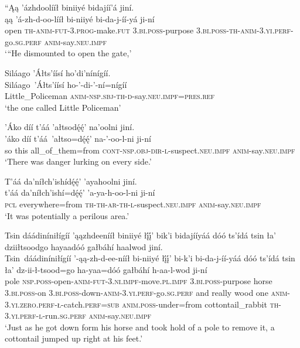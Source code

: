 \ea\label{ex:text2-16-1}
``Ąą ’ázhdoolííł biniiyé bidajíí’á jiní.\\
\gll ąą	’á-zh-d-oo-lííł	bi-niiyé	bi-da-j-íí-yá	ji-ní\\
     open	\textsc{th}-\textsc{anim}-\textsc{fut}-3.\textsc{prog}-make.\textsc{fut}	3.\textsc{bi}.\textsc{poss}-purpose	3.\textsc{bi}.\textsc{poss}-\textsc{th}-\textsc{anim}-3.\textsc{yi}.\textsc{perf}-go.\textsc{sg}.\textsc{perf}	\textsc{anim}-say.\textsc{neu}.\textsc{impf}\\
\glt `{``}He dismounted to open the gate,'
\z

\ea\label{ex:text2-16-2}
Siláago ’Áłts’íísí ho’di’nínígíí.\\
\gll Siláago~{’Áłts’íísí}	ho-’-di-’-ní=nígíí\\
     Little\_Policeman	\textsc{anim}-\textsc{nsp}.\textsc{sbj}-\textsc{th}-\textsc{d}-say.\textsc{neu}.\textsc{impf}=\textsc{pres}.\textsc{ref}\\
\glt `the one called Little Policeman'
\z

\ea\label{ex:text2-16-3}
’Áko díí t’áá ’ałtsodę́ę́’ na’oolni jiní.\\
\gll ’áko	díí	t’áá~{’ałtso=dę́ę́’}	na-’-oo-l-ni	ji-ní\\
     so	this	all\_of\_them=from	\textsc{cont}-\textsc{nsp}.\textsc{obj}-\textsc{dir}-\textsc{l}-suspect.\textsc{neu}.\textsc{impf}	\textsc{anim}-say.\textsc{neu}.\textsc{impf}\\
\glt `There was danger lurking on every side.'
\z

\ea\label{ex:text2-16-4}
T’áá da’níłch’ishídę́ę́’ ’ayahoolni jiní.\\
\gll t’áá	da’níłch’ishí=dę́ę́’	’a-ya-h-oo-l-ni	ji-ní\\
     \textsc{pcl}	everywhere=from	\textsc{th}-\textsc{th}-\textsc{ar}-\textsc{th}-\textsc{l}-suspect.\textsc{neu}.\textsc{impf}	\textsc{anim}-say.\textsc{neu}.\textsc{impf}\\
\glt `It was potentially a perilous area.'
\z

\ea\label{ex:text2-16-5}
Tsin dáádiníniłígíí ’ąązhdeenííł biniiyé łį́į́’ bik’i bidajííyáá dóó ts’ídá tsin ła’ dziiłtsoodgo hayaadóó gałbáhí haalwod jiní.\\
\gll Tsin~{dáádiníniłígíí}	’-ąą-zh-d-ee-nííł	bi-niiyé	łį́į́’	bi-k’i	bi-da-j-íí-yáá	dóó	ts’ídá	tsin	ła’	dz-ii-ł-tsood=go	ha-yaa=dóó	gałbáhí	h-aa-l-wod	ji-ní\\
     pole	\textsc{nsp}.\textsc{poss}-open-\textsc{anim}-\textsc{fut}-3.\textsc{ni}.\textsc{impf}-move.\textsc{pl}.\textsc{impf}	3.\textsc{bi}.\textsc{poss}-purpose	horse	3.\textsc{bi}.\textsc{poss}-on	3.\textsc{bi}.\textsc{poss}-down-\textsc{anim}-3.\textsc{yi}.\textsc{perf}-go.\textsc{sg}.\textsc{perf}	and	really	wood	one	\textsc{anim}-3.\textsc{yi}.\textsc{zero}.\textsc{perf}-\textsc{ł}-catch.\textsc{perf}=\textsc{sub}	\textsc{anim}.\textsc{poss}-under=from	cottontail\_rabbit	\textsc{th}-3.\textsc{yi}.\textsc{perf}-\textsc{l}-run.\textsc{sg}.\textsc{perf}	\textsc{anim}-say.\textsc{neu}.\textsc{impf}\\
\glt `Just as he got down form his horse and took hold of a pole to remove it, a cottontail jumped up right at his feet.'
\z

